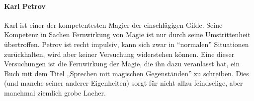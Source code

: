 \documentclass[a4paper,10pt]{scrartcl}
\begin{document}
\paragraph{Karl Petrov}

Karl ist einer der kompetentesten Magier der einschlägigen Gilde. Seine
Kompetenz in Sachen Fernwirkung von Magie ist nur durch seine
Umstrittenheit übertroffen. Petrov ist recht impulsiv, kann sich zwar in
"`normalen"' Situationen zurückhalten, wird aber keiner Versuchung
widerstehen können. Eine dieser Versuchungen ist die Fernwirkung der
Magie, die ihn dazu veranlasst hat, ein Buch mit dem Titel „Sprechen mit
magischen Gegenständen” zu schreiben. Dies (und manche seiner anderer
Eigenheiten) sorgt für nicht allzu feindselige, aber manchmal ziemlich
grobe Lacher.
\end{document}
